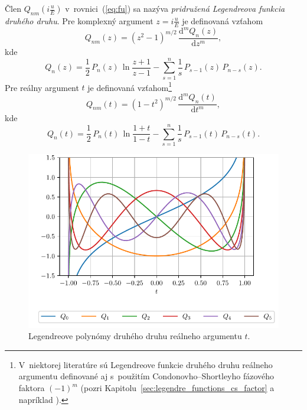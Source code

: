 \documentclass[a4paper,12pt]{book}
\newcommand{\diff}{\mathrm d}
\begin{document}
Člen $Q_{nm}\left( i \frac{u}{E} \right)$ v~rovnici~(\ref{eq:fu}) sa nazýva 
\emph{pridružená Legendreova funkcia druhého druhu}.  Pre komplexný argument $z 
= i \frac{u}{E}$ je definovaná vzťahom \parencite{MoritzPhysicalGeodesy}
%
\begin{equation}
\label{eq:qnm_imag_def}
Q_{nm}(z) = (z^2 - 1)^{m \slash 2} \, \frac{\diff^m Q_n(z)}{\diff z^m}{,}
\end{equation}
%
kde
%
\begin{equation}
\label{eq:qn0_imag_def}
Q_{n}(z) = \frac{1}{2} \, P_n(z) \, \ln\frac{z + 1}{z - 1} - \sum_{s = 1}^n 
\frac{1}{s} \, P_{s - 1}(z) \, P_{n - s}(z){.}
\end{equation}
%
Pre reálny argument $t$ je definovaná vzťahom\footnote{V~niektorej literatúre 
sú Legendreove funkcie druhého druhu reálneho argumentu definované aj 
s~použitím Condonovho--Shortleyho fázového faktora $(-1)^m$ (pozri 
Kapitolu~\ref{sec:legendre_functions_cs_factor} a napríklad \cite{Olver2010}).}
\parencite{MoritzPhysicalGeodesy}
%
\begin{equation}
\label{eq:qnm_real_def}
Q_{nm}(t) = (1 - t^2)^{m \slash 2} \, \frac{\diff^m Q_n(t)}{\diff t^m}{,}
\end{equation}
%
kde
%
\begin{equation}
\label{eq:qn0_real_def}
Q_{n}(t) = \frac{1}{2} \, P_n(t) \, \ln\frac{1 + t}{1 - t} - \sum_{s = 1}^n 
\frac{1}{s} \, P_{s - 1}(t) \, P_{n - s}(t){.}
\end{equation}

\begin{figure}
\centering
\includegraphics{./fig-legendre-polynomials-qn.pdf}
\caption{Legendreove polynómy druhého druhu reálneho argumentu $t$.}
\label{fig:lp_2nd}
\end{figure}
\end{document}
